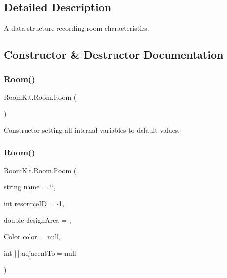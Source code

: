 \subsection{Detailed Description}
A data structure recording room characteristics. 



\subsection{Constructor \& Destructor Documentation}
\mbox{\label{class_room_kit_1_1_room_a15c13a2f850ec32872c0b95627ebbb04}} 
\subsubsection{\texorpdfstring{Room()}{Room()}\hspace{0.1cm}{\footnotesize\ttfamily [1/4]}}
{\footnotesize\ttfamily Room\+Kit.\+Room.\+Room (\begin{DoxyParamCaption}{ }\end{DoxyParamCaption})}



Constructor setting all internal variables to default values. 

\mbox{\label{class_room_kit_1_1_room_a9bcaf10fbec164053d9d510722ceeff5}} 
\subsubsection{\texorpdfstring{Room()}{Room()}\hspace{0.1cm}{\footnotesize\ttfamily [2/4]}}
{\footnotesize\ttfamily Room\+Kit.\+Room.\+Room (\begin{DoxyParamCaption}\item[{string}]{name = {\ttfamily \char`\"{}\char`\"{}},  }\item[{int}]{resource\+ID = {\ttfamily -\/1},  }\item[{double}]{design\+Area = {},  }\item[{\mbox{\hyperlink{class_room_kit_1_1_room_ab988d7b6d772b68911acacc8da422052}{Color}}}]{color = {\ttfamily null},  }\item[{int \mbox{[}$\,$\mbox{]}}]{adjacent\+To = {\ttfamily null} }\end{DoxyParamCaption})}



